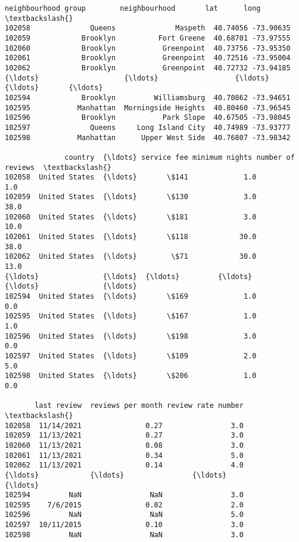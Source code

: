 \documentclass[11pt]{article}
\begin{document}
\begin{tcolorbox}[breakable, size=fbox, boxrule=.5pt, pad at break*=1mm, opacityfill=0]
\begin{Verbatim}[commandchars=\\\{\}]
       neighbourhood group        neighbourhood       lat      long  \textbackslash{}
102058              Queens              Maspeth  40.74056 -73.90635
102059            Brooklyn          Fort Greene  40.68701 -73.97555
102060            Brooklyn           Greenpoint  40.73756 -73.95350
102061            Brooklyn           Greenpoint  40.72516 -73.95004
102062            Brooklyn           Greenpoint  40.72732 -73.94185
{\ldots}                    {\ldots}                  {\ldots}       {\ldots}       {\ldots}
102594            Brooklyn         Williamsburg  40.70862 -73.94651
102595           Manhattan  Morningside Heights  40.80460 -73.96545
102596            Brooklyn           Park Slope  40.67505 -73.98045
102597              Queens     Long Island City  40.74989 -73.93777
102598           Manhattan      Upper West Side  40.76807 -73.98342

              country  {\ldots} service fee minimum nights number of reviews  \textbackslash{}
102058  United States  {\ldots}       \$141             1.0               1.0
102059  United States  {\ldots}       \$130             3.0              38.0
102060  United States  {\ldots}       \$181             3.0              10.0
102061  United States  {\ldots}       \$118            30.0              38.0
102062  United States  {\ldots}        \$71            30.0              13.0
{\ldots}               {\ldots}  {\ldots}         {\ldots}            {\ldots}               {\ldots}
102594  United States  {\ldots}       \$169             1.0               0.0
102595  United States  {\ldots}       \$167             1.0               1.0
102596  United States  {\ldots}       \$198             3.0               0.0
102597  United States  {\ldots}       \$109             2.0               5.0
102598  United States  {\ldots}       \$206             1.0               0.0

       last review  reviews per month review rate number  \textbackslash{}
102058  11/14/2021               0.27                3.0
102059  11/13/2021               0.27                3.0
102060  11/13/2021               0.08                3.0
102061  11/13/2021               0.34                5.0
102062  11/13/2021               0.14                4.0
{\ldots}            {\ldots}                {\ldots}                {\ldots}
102594         NaN                NaN                3.0
102595    7/6/2015               0.02                2.0
102596         NaN                NaN                5.0
102597  10/11/2015               0.10                3.0
102598         NaN                NaN                3.0


\end{Verbatim}
\end{tcolorbox}
\end{document}
